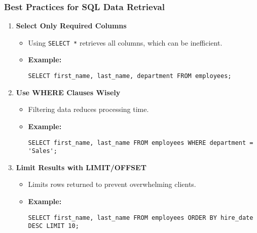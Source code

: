 \documentclass[aspectratio=169]{beamer}
\begin{document}
\begin{frame}[fragile]
    \frametitle{Best Practices for SQL Data Retrieval}
    \begin{enumerate}
        \item \textbf{Select Only Required Columns}
            \begin{itemize}
                \item Using \texttt{SELECT *} retrieves all columns, which can be inefficient.
                \item \textbf{Example:} 
                \begin{lstlisting}
SELECT first_name, last_name, department FROM employees;
                \end{lstlisting}
            \end{itemize}

        \item \textbf{Use WHERE Clauses Wisely}
            \begin{itemize}
                \item Filtering data reduces processing time.
                \item \textbf{Example:} 
                \begin{lstlisting}
SELECT first_name, last_name FROM employees WHERE department = 'Sales';
                \end{lstlisting}
            \end{itemize}

        \item \textbf{Limit Results with LIMIT/OFFSET}
            \begin{itemize}
                \item Limits rows returned to prevent overwhelming clients.
                \item \textbf{Example:} 
                \begin{lstlisting}
SELECT first_name, last_name FROM employees ORDER BY hire_date DESC LIMIT 10;
                \end{lstlisting}
            \end{itemize}
    \end{enumerate}
\end{frame}
\end{document}
